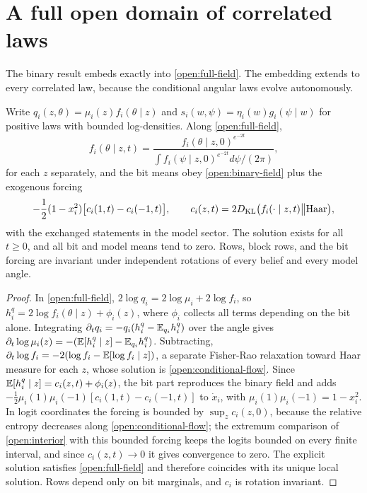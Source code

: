 \section{A full open domain of correlated laws}

The binary result embeds exactly into \cref{open:full-field}. The embedding extends to every correlated law, because the conditional angular laws evolve autonomously.

Write $q_i(z,\theta)=\mu_i(z)f_i(\theta\mid z)$ and $s_i(w,\psi)=\eta_i(w)g_i(\psi\mid w)$ for positive laws with bounded log-densities. Along \cref{open:full-field},
\begin{equation}
f_i(\theta\mid z,t)=
\frac{f_i(\theta\mid z,0)^{e^{-2t}}}
{\int f_i(\psi\mid z,0)^{e^{-2t}}d\psi/(2\pi)},
\label{open:conditional-flow}
\end{equation}
for each $z$ separately, and the bit means obey \cref{open:binary-field} plus the exogenous forcing
\begin{equation}
-\frac12(1-x_i^2)\bigl[c_i(1,t)-c_i(-1,t)\bigr],
\qquad
c_i(z,t)=2D_{\mathrm{KL}}\bigl(f_i(\cdot\mid z,t)\big\|\mathrm{Haar}\bigr),
\label{open:bit-forcing}
\end{equation}
with the exchanged statements in the model sector. The solution exists for all $t\ge0$, and all bit and model means tend to zero. Rows, block rows, and the bit forcing are invariant under independent rotations of every belief and every model angle.
\begin{proof}
In \cref{open:full-field}, $2\log q_i=2\log\mu_i+2\log f_i$, so $h_i^q=2\log f_i(\theta\mid z)+\phi_i(z)$, where $\phi_i$ collects all terms depending on the bit alone. Integrating $\partial_tq_i=-q_i(h_i^q-\mathbb E_{q_i}h_i^q)$ over the angle gives $\partial_t\log\mu_i(z)=-(\mathbb E[h_i^q\mid z]-\mathbb E_{q_i}h_i^q)$. Subtracting, $\partial_t\log f_i=-2(\log f_i-\mathbb E[\log f_i\mid z])$, a separate Fisher-Rao relaxation toward Haar measure for each $z$, whose solution is \cref{open:conditional-flow}. Since $\mathbb E[h_i^q\mid z]=c_i(z,t)+\phi_i(z)$, the bit part reproduces the binary field and adds $-\frac12\mu_i(1)\mu_i(-1)[c_i(1,t)-c_i(-1,t)]$ to $\dot x_i$, with $\mu_i(1)\mu_i(-1)=1-x_i^2$. In logit coordinates the forcing is bounded by $\sup_z c_i(z,0)$, because the relative entropy decreases along \cref{open:conditional-flow}; the extremum comparison of \cref{open:interior} with this bounded forcing keeps the logits bounded on every finite interval, and since $c_i(z,t)\to0$ it gives convergence to zero. The explicit solution satisfies \cref{open:full-field} and therefore coincides with its unique local solution. Rows depend only on bit marginals, and $c_i$ is rotation invariant.
\end{proof}

